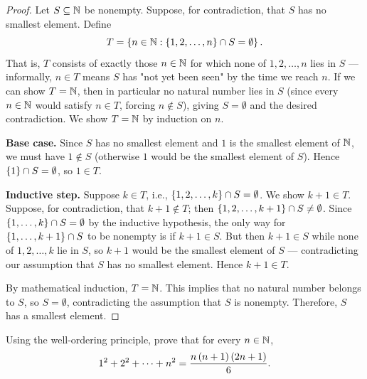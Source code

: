 \begin{proof}
    Let $S\subseteq\mathbb{N}$ be nonempty. Suppose, for contradiction, that $S$ has no smallest element. Define
    \begin{equation*}
        T=\left\{n\in\mathbb{N} : \left\{1,2,\ldots,n\right\}\cap S=\emptyset\right\}.
    \end{equation*}
    That is, $T$ consists of exactly those $n\in\mathbb{N}$ for which none of $1,2,\ldots,n$ lies in $S$ — informally, $n\in T$ means $S$ has "not yet been seen" by the time we reach $n$. If we can show $T=\mathbb{N}$, then in particular no natural number lies in $S$ (since every $n\in\mathbb{N}$ would satisfy $n\in T$, forcing $n\notin S$), giving $S=\emptyset$ and the desired contradiction. We show $T=\mathbb{N}$ by induction on $n$.

    \textbf{Base case.} Since $S$ has no smallest element and $1$ is the smallest element of $\mathbb{N}$, we must have $1\notin S$ (otherwise $1$ would be the smallest element of $S$). Hence $\left\{1\right\}\cap S=\emptyset$, so $1\in T$.

    \textbf{Inductive step.} Suppose $k\in T$, i.e., $\left\{1,2,\ldots,k\right\}\cap S=\emptyset$. We show $k+1\in T$. Suppose, for contradiction, that $k+1\notin T$; then $\left\{1,2,\ldots,k+1\right\}\cap S\neq\emptyset$. Since $\left\{1,\ldots,k\right\}\cap S=\emptyset$ by the inductive hypothesis, the only way for $\left\{1,\ldots,k+1\right\}\cap S$ to be nonempty is if $k+1\in S$. But then $k+1\in S$ while none of $1,2,\ldots,k$ lie in $S$, so $k+1$ would be the smallest element of $S$ — contradicting our assumption that $S$ has no smallest element. Hence $k+1\in T$.

    By mathematical induction, $T=\mathbb{N}$. This implies that no natural number belongs to $S$, so $S=\emptyset$, contradicting the assumption that $S$ is nonempty. Therefore, $S$ has a smallest element.
\end{proof}

\begin{proposition}\label{prop:sum-n-squared}
    Using the well-ordering principle, prove that for every $n\in\mathbb{N}$,
    \begin{equation*}
        1^2 + 2^2 + \cdots + n^2 = \frac{n\left(n + 1\right)\left(2n + 1\right)}{6}.
    \end{equation*}
\end{proposition}

